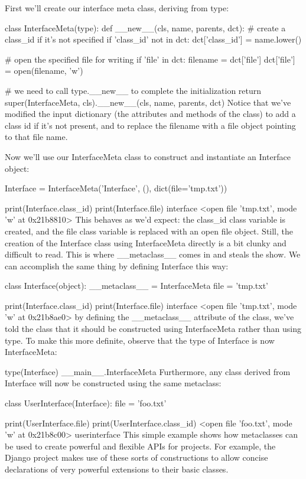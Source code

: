 First we'll create our interface meta class, deriving from type:

class InterfaceMeta(type):
    def __new__(cls, name, parents, dct):
        # create a class_id if it's not specified
        if 'class_id' not in dct:
            dct['class_id'] = name.lower()

        # open the specified file for writing
        if 'file' in dct:
            filename = dct['file']
            dct['file'] = open(filename, 'w')

        # we need to call type.__new__ to complete the initialization
        return super(InterfaceMeta, cls).__new__(cls, name, parents, dct)
Notice that we've modified the input dictionary (the attributes and methods of the class) to add a class id if it's not present, and to replace the filename with a file object pointing to that file name.

Now we'll use our InterfaceMeta class to construct and instantiate an Interface object:

Interface = InterfaceMeta('Interface', (), dict(file='tmp.txt'))

print(Interface.class_id)
print(Interface.file)
interface
<open file 'tmp.txt', mode 'w' at 0x21b8810>
This behaves as we'd expect: the class_id class variable is created, and the file class variable is replaced with an open file object. Still, the creation of the Interface class using InterfaceMeta directly is a bit clunky and difficult to read. This is where __metaclass__ comes in and steals the show. We can accomplish the same thing by defining Interface this way:

class Interface(object):
    __metaclass__ = InterfaceMeta
    file = 'tmp.txt'

print(Interface.class_id)
print(Interface.file)
interface
<open file 'tmp.txt', mode 'w' at 0x21b8ae0>
by defining the __metaclass__ attribute of the class, we've told the class that it should be constructed using InterfaceMeta rather than using type. To make this more definite, observe that the type of Interface is now InterfaceMeta:

type(Interface)
__main__.InterfaceMeta
Furthermore, any class derived from Interface will now be constructed using the same metaclass:

class UserInterface(Interface):
    file = 'foo.txt'

print(UserInterface.file)
print(UserInterface.class_id)
<open file 'foo.txt', mode 'w' at 0x21b8c00>
userinterface
This simple example shows how metaclasses can be used to create powerful and flexible APIs for projects. For example, the Django project makes use of these sorts of constructions to allow concise declarations of very powerful extensions to their basic classes.

